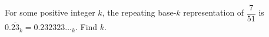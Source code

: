 For some positive integer $k$, the repeating base-$k$ representation of $\dfrac7{51}$ is $0.\overline{23}_k=0.232323\ldots_k$. Find $k$.
